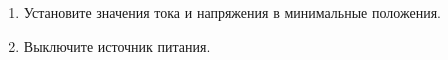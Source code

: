 \begin{enumerate}

\item Установите значения тока и напряжения в минимальные положения.
\item Выключите источник питания.

\end{enumerate}
